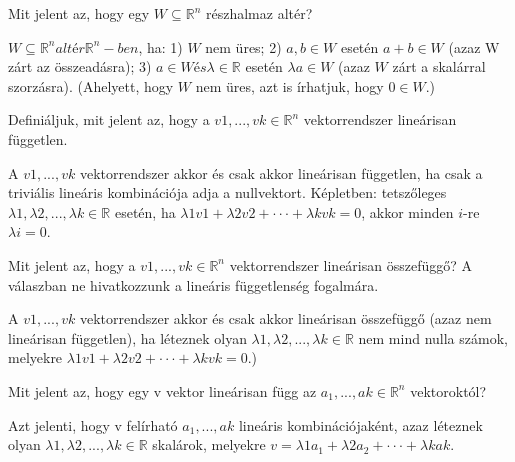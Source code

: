 \begin{frame}
  \begin{tcolorbox}[title={1}]
      Mit jelent az, hogy egy $W {\subseteq} \mathbb{R}^n$ részhalmaz altér?

  \tcblower
$W {\subseteq} \mathbb{R}^n altér \mathbb{R}^n-ben$, ha: 1) $W$ nem üres; 2) $a,b \in W$ esetén $a + b \in W$ (azaz W zárt az összeadásra); 3) $a \in W és {\lambda} \in \mathbb{R}$ esetén ${\lambda}a \in W$ (azaz $W$ zárt a skalárral szorzásra). (Ahelyett, hogy $W$ nem üres, azt is írhatjuk, hogy $0 \in W$.)
  \end{tcolorbox}
\end{frame}


\begin{frame}
  \begin{tcolorbox}[title={2}]
      Definiáljuk, mit jelent az, hogy a $v1,...,vk \in \mathbb{R}^n$ vektorrendszer lineárisan független.

  \tcblower
A $v1,...,vk$ vektorrendszer akkor és csak akkor lineárisan független, ha csak a triviális lineáris kombinációja adja a nullvektort. Képletben: tetszőleges ${\lambda}1,{\lambda}2,...,{\lambda}k \in \mathbb{R}$ esetén, ha ${\lambda}1v1 + {\lambda}2v2 +  \cdot  \cdot  \cdot  + {\lambda}kvk = 0$, akkor minden $i$-re ${\lambda}i = 0$.
  \end{tcolorbox}
\end{frame}


\begin{frame}
  \begin{tcolorbox}[title={3}]
      Mit jelent az, hogy a $v1,...,vk \in \mathbb{R}^n$ vektorrendszer lineárisan összefüggő? A válaszban ne hivatkozzunk a lineáris függetlenség fogalmára.


  \tcblower
A $v1,...,vk$ vektorrendszer akkor és csak akkor lineárisan összefüggő (azaz nem lineárisan független), ha léteznek olyan ${\lambda}1,{\lambda}2,...,{\lambda}k \in \mathbb{R}$ nem mind nulla számok, melyekre ${\lambda}1v1 + {\lambda}2v2 +  \cdot  \cdot  \cdot  + {\lambda}kvk = 0$.)

  \end{tcolorbox}
\end{frame}

\begin{frame}
  \begin{tcolorbox}[title={4}]
     Mit jelent az, hogy egy v vektor lineárisan függ az $a_1,...,ak \in \mathbb{R}^n$ vektoroktól?

  \tcblower
Azt jelenti, hogy v felírható $a_1,...,ak$ lineáris kombinációjaként, azaz léteznek olyan ${\lambda}1,{\lambda}2,...,{\lambda}k \in \mathbb{R}$ skalárok, melyekre $v = {\lambda}1a_1 + {\lambda}2a_2 +  \cdot  \cdot  \cdot  + {\lambda}kak$.
  \end{tcolorbox}
\end{frame}


